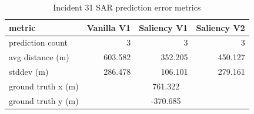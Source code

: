 \begin{table}[ht]
\centering
\caption{Incident 31 SAR prediction error metrics}
\label{tab:sar-incident-31}
\begin{tabular}{lrrr}
\hline
metric & Vanilla V1 & Saliency V1 & Saliency V2 \\
\hline
prediction count & 3 & 3 & 3 \\
avg distance (m) & 603.582 & 352.205 & 450.127 \\
stddev (m) & 286.478 & 106.101 & 279.161 \\
ground truth x (m) & \multicolumn{3}{c}{761.322} \\
ground truth y (m) & \multicolumn{3}{c}{-370.685} \\
\hline
\end{tabular}
\end{table}
